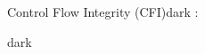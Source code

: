 \label{Control Flow Integrity (CFI)}
\begin{baseBoxThree}{Control Flow Integrity (CFI)}{dark}
    \bigskip
    :
    \bigskip
    \begin{baseBoxThree}{}{dark}

    \end{baseBoxThree}
    \smallskip
\end{baseBoxThree}
